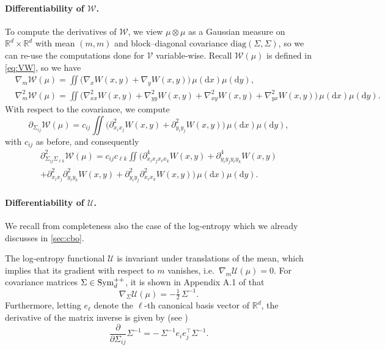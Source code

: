 \documentclass{article}
\theoremstyle{plain}
\theoremstyle{definition}
\theoremstyle{remark}
\newcommand{\pd}{\textup{Sym}^{++}_d}
\begin{document}
\paragraph{Differentiability of $\mathcal{W}$.}
To compute the derivatives of $\mathcal{W}$, we view $\mu\otimes\mu$ as a Gaussian measure on $\mathbb{R}^d\times\mathbb{R}^d$ with mean $(m,m)$ and block–diagonal covariance $\mathrm{diag}(\Sigma,\Sigma)$, so we can re-use the computations done for $\mathcal{V}$ variable-wise. 
Recall $\mathcal{W}(\mu)$ is defined in \eqref{eq:VW}, so we have
\begin{align*}
&\nabla_{m}\mathcal{W}(\mu)
= \iint \big(\nabla_x W(x,y)+\nabla_y W(x,y)\big)\,\mu(\mathrm{d}x)\mu(\mathrm{d}y),
\\
&\nabla_{m}^2\mathcal{W}(\mu)
= \iint \big(
\nabla_{xx}^2 W(x,y)+\nabla_{yy}^2 W(x,y)+\nabla_{xy}^2 W(x,y)+\nabla_{yx}^2 W(x,y)
\big)\,\mu(\mathrm{d}x)\mu(\mathrm{d}y).
\end{align*}
With respect to the covariance, we compute
\[
\partial_{\Sigma_{ij}} \mathcal{W}(\mu)
= c_{ij}\iint \big(\partial^2_{x_i x_j} W(x,y)+\partial^2_{y_i y_j} W(x,y)\big)\,\mu(\mathrm{d}x)\mu(\mathrm{d}y),
\]
with $c_{ij}$ as before, and consequently
\begin{multline*}
\partial^2_{\Sigma_{ij}\Sigma_{\ell k}} \mathcal{W}(\mu)
= c_{ij}c_{\ell k}\iint \Big(
\partial^4_{x_i x_j x_\ell x_k} W(x,y)
+
\partial^4_{y_i y_j y_\ell y_k} W(x,y) \\
+
\partial^2_{x_i x_j}\partial^2_{y_\ell y_k} W(x,y)
+
\partial^2_{y_i y_j}\partial^2_{x_\ell x_k} W(x,y)
\Big)\,\mu(\mathrm{d}x)\mu(\mathrm{d}y).
\end{multline*}

\paragraph{Differentiability of $\mathcal{U}$.} We recall from completeness also the case of the log-entropy which we already discusses in \cref{sec:cbo}.

The log-entropy functional $\mathcal U$ is invariant under translations of the mean, which implies that its gradient with respect to $m$ vanishes, i.e.\ $\nabla_m \mathcal U(\mu)=0$.  
For covariance matrices $\Sigma\in\pd$, it is shown in Appendix A.1 of \citep{lambert2022variational} that
\[
\nabla_\Sigma \mathcal U(\mu) = -\tfrac12\,\Sigma^{-1}.
\]
Furthermore, letting $e_\ell$ denote the $\ell$-th canonical basis vector of $\mathbb R^d$, the derivative of the matrix inverse is given by (see \cite{giles2008matrix})
\[
\frac{\partial}{\partial \Sigma_{ij}} \Sigma^{-1}
= -\,\Sigma^{-1} e_i e_j^\top \Sigma^{-1}.
\]
\end{document}
